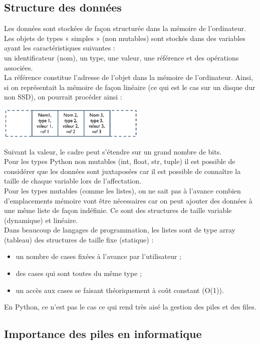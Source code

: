 \subsection{Structure des données}

Les données sont stockées de façon structurée dans la mémoire de l'ordinateur. Les objets de types « simples » (non mutables) sont stockés dans des variables ayant les caractéristiques suivantes :\\
un identificateur (nom), un type, une valeur, une référence et des opérations associées.\\
La référence constitue l'adresse de l'objet dans la mémoire de l'ordinateur.
Ainsi, si on représentait la mémoire de façon linéaire (ce qui est le cas sur un disque dur non SSD), on pourrait procéder ainsi :

\begin{center}
\includegraphics[height=0.08\textwidth]{images/pile2.png}
\end{center}

Suivant la valeur, le cadre peut s'étendre sur un grand nombre de bits.\\
Pour les types Python non mutables (int, float, str, tuple) il est possible de considérer que les données sont juxtaposées car il est possible de connaître la taille de chaque variable lors de l'affectation.\\
Pour les types mutables (comme les listes), on ne sait pas à l'avance combien d'emplacements mémoire vont être nécessaires car on peut ajouter des données à une même liste de façon indéfinie. Ce sont des structures de taille variable (dynamique) et linéaire.\\
Dans beaucoup de langages de programmation, les listes sont de type array (tableau) des structures de taille fixe (statique) :
\begin{itemize}
\item un nombre de cases fixées à l'avance par l'utilisateur ;
\item des cases qui sont toutes du même type ;
\item un accès aux cases se faisant théoriquement à coût constant (O(1)).
\end{itemize}
En Python, ce n'est pas le cas ce qui rend très aisé la gestion des piles et des files.

\subsection{Importance des piles en informatique}

